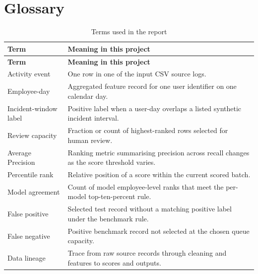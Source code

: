 \section{Glossary}
\begin{longtable}{|p{}|p{}|}
\caption{Terms used in the report}\label{tab:glossary}\\
\hline
\textbf{Term} & \textbf{Meaning in this project}\\\hline
\endfirsthead
\hline
\textbf{Term} & \textbf{Meaning in this project}\\\hline
\endhead
\hline
\endlastfoot
Activity event & One row in one of the input CSV source logs.\\\hline
Employee-day & Aggregated feature record for one user identifier on one calendar day.\\\hline
Incident-window label & Positive label when a user-day overlaps a listed synthetic incident interval.\\\hline
Review capacity & Fraction or count of highest-ranked rows selected for human review.\\\hline
Average Precision & Ranking metric summarising precision across recall changes as the score threshold varies.\\\hline
Percentile rank & Relative position of a score within the current scored batch.\\\hline
Model agreement & Count of model employee-level ranks that meet the per-model top-ten-percent rule.\\\hline
False positive & Selected test record without a matching positive label under the benchmark rule.\\\hline
False negative & Positive benchmark record not selected at the chosen queue capacity.\\\hline
Data lineage & Trace from raw source records through cleaning and features to scores and outputs.\\\hline
\end{longtable}

